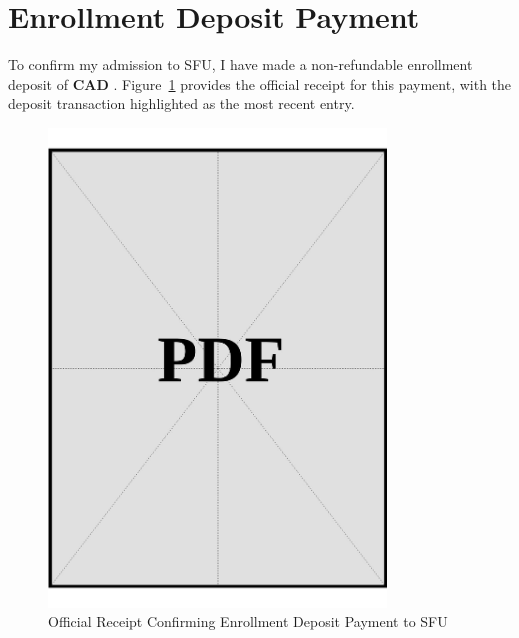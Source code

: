 \clearpage

\section{Enrollment Deposit Payment}
\label{sec:enrollment-deposit}

\noindent
To confirm my admission to SFU, I have made a non-refundable enrollment deposit of \textbf{CAD \enrollmentDeposit}. Figure~\ref{fig:enrollment-deposit} provides the official receipt for this payment, with the deposit transaction highlighted as the most recent entry.

\vspace*{\fill}

\begin{figure}[h]
    \centering
    \includegraphics[page=1, width=0.8\textwidth]{../application-docs/applicant/canadian-institution/deposit-payments/enrollment-receipt.pdf}
    \caption{Official Receipt Confirming Enrollment Deposit Payment to SFU}
    \label{fig:enrollment-deposit}
\end{figure}

\vspace*{\fill}
\clearpage
